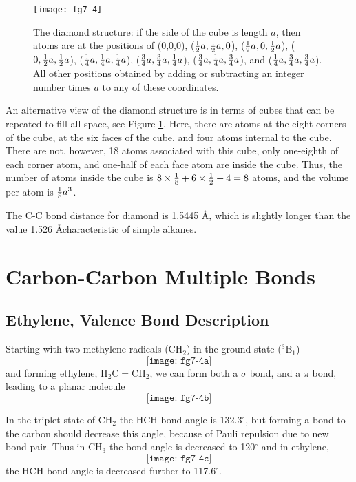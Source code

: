 \begin{figure}
\texttt{[image: fg7-4]}
\caption{The diamond structure: if the side of the cube is 
length $a$, then atoms are at the positions of
(0,0,0), (${1 \over 2}a, {1 \over 2}a,0$), (${1 \over 2}a,0,{1 \over 
2}a$), ($0,{1 \over 2}a, {1 \over 2}a$), (${1 \over 4}a, {1 \over 
4}a, {1 \over 4}a$), (${3 \over 4}a, {3 \over 4}a, {1 \over 4}a$), 
(${3 \over 4}a, {1 \over 4}a, {3 \over 4}a$), and (${1 \over 4}a, {3 
\over 4}a, {3 \over 4}a$).  All other positions obtained by adding or 
subtracting an integer number times $a$ to any of these coordinates.}
\label{chap7-fig4}
\end{figure}

An alternative view of the diamond structure is in terms of cubes that
can be repeated to fill all space, see Figure \ref{chap7-fig4}.  Here,
there are atoms at the eight corners of the cube, at the six faces of
the cube, and four atoms internal to the cube.  There are not,
however, 18 atoms associated with this cube, only one-eighth of each
corner atom, and one-half of each face atom are inside the cube.
Thus, the number of atoms inside the cube is $8 \times {1 \over 8} + 6
\times {1 \over 2} + 4 = 8$ atoms, and the volume per atom is ${1
\over 8}a^3$.

The C-C bond distance for diamond is 1.5445 \AA, which is slightly
longer than the value 1.526 \AA characteristic of simple alkanes.

\section{Carbon-Carbon Multiple Bonds}

\subsection{Ethylene, Valence Bond Description}

Starting with two methylene radicals (CH$_2$) in the ground state 
($^3$B$_1$)
\begin{equation}
\texttt{[image: fg7-4a]}
\label{chap7-eqno14}
\end{equation}
and forming ethylene, H$_2$C$=$CH$_2$, we can form both a $\sigma$ bond, and 
a $\pi$ bond, leading to a planar molecule
\begin{equation}
\texttt{[image: fg7-4b]}
\label{chap7-eqno15}
\end{equation}

In the triplet state of CH$_2$ the HCH bond angle is 132.3$^{\circ}$, but 
forming a bond to the carbon should decrease this angle, because of
Pauli repulsion due to new bond pair.  Thus in CH$_3$ the 
bond angle is decreased to 120$^{\circ}$ and in ethylene,
\begin{equation}
\texttt{[image: fg7-4c]}
\label{chap7-eqno16}
\end{equation}
the HCH bond angle is decreased further to 117.6$^{\circ}$.

